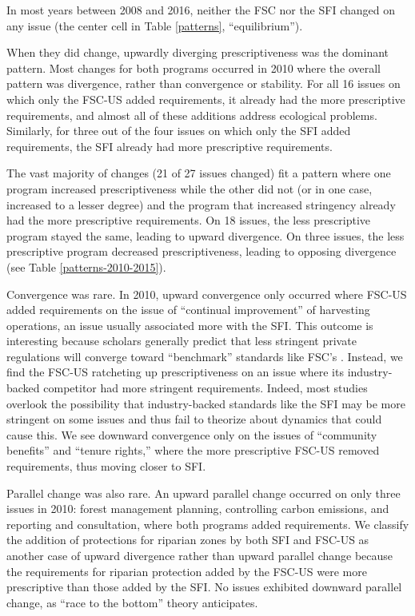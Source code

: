 \documentclass[
      12pt,
            Review ]{article}
\begin{document}
In most years between 2008 and 2016, neither the FSC nor the SFI changed on any issue (the center cell in Table \ref{patterns}, ``equilibrium'').

When they did change, upwardly diverging prescriptiveness was the dominant pattern. Most changes for both programs occurred in 2010 where the overall pattern was divergence, rather than convergence or stability. For all 16 issues on which only the FSC-US added requirements, it already had the more prescriptive requirements, and almost all of these additions address ecological problems. Similarly, for three out of the four issues on which only the SFI added requirements, the SFI already had more prescriptive requirements.

The vast majority of changes (21 of 27 issues changed) fit a pattern where one program increased prescriptiveness while the other did not (or in one case, increased to a lesser degree) and the program that increased stringency already had the more prescriptive requirements. On 18 issues, the less prescriptive program stayed the same, leading to upward divergence. On three issues, the less prescriptive program decreased prescriptiveness, leading to opposing divergence (see Table \ref{patterns-2010-2015}).



Convergence was rare. In 2010, upward convergence only occurred where FSC-US added requirements on the issue of ``continual improvement'' of harvesting operations, an issue usually associated more with the SFI. This outcome is interesting because scholars generally predict that less stringent private regulations will converge toward ``benchmark'' standards like FSC's \citep{Overdevest2005, Overdevest2010}. Instead, we find the FSC-US ratcheting up prescriptiveness on an issue where its industry-backed competitor had more stringent requirements. Indeed, most studies overlook the possibility that industry-backed standards like the SFI may be more stringent on some issues and thus fail to theorize about dynamics that could cause this. We see downward convergence only on the issues of ``community benefits'' and ``tenure rights,'' where the more prescriptive FSC-US removed requirements, thus moving closer to SFI.

Parallel change was also rare. An upward parallel change occurred on only three issues in 2010: forest management planning, controlling carbon emissions, and reporting and consultation, where both programs added requirements. We classify the addition of protections for riparian zones by both SFI and FSC-US as another case of upward divergence rather than upward parallel change because the requirements for riparian protection added by the FSC-US were more prescriptive than those added by the SFI. No issues exhibited downward parallel change, as ``race to the bottom'' theory anticipates.
\end{document}
